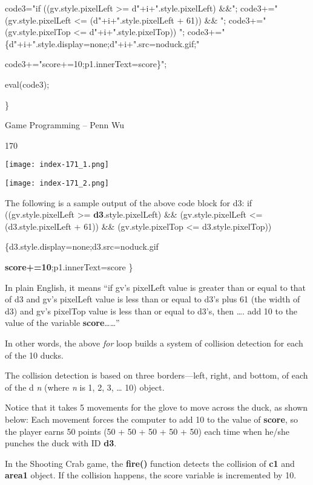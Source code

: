 \documentclass[
]{article}
\begin{document}
code3="if ((gv.style.pixelLeft \textgreater= d"+i+".style.pixelLeft)
\&\&"; code3+=" (gv.style.pixelLeft \textless= (d"+i+".style.pixelLeft +
61)) \&\& "; code3+=" (gv.style.pixelTop \textless=
d"+i+".style.pixelTop)) ";
code3+="\{d"+i+".style.display=\textquotesingle none\textquotesingle;d"+i+".src=\textquotesingle noduck.gif\textquotesingle;"

code3+="score+=10;p1.innerText=score\}";

eval(code3);

\}

Game Programming -- Penn Wu

170

\protect\hypertarget{index_split_011.htmlux5cux23p171}{}{}\texttt{[image: index-171\_1.png]}

\texttt{[image: index-171\_2.png]}

The following is a sample output of the above code block for d3: if
((gv.style.pixelLeft \textgreater= \textbf{d3}.style.pixelLeft) \&\&
(gv.style.pixelLeft \textless= (d3.style.pixelLeft + 61)) \&\&
(gv.style.pixelTop \textless= d3.style.pixelTop))

\{d3.style.display=\textquotesingle none\textquotesingle;d3.src=\textquotesingle noduck.gif\textquotesingle{}

\textbf{score+=10};p1.innerText=score \}

In plain English, it means ``if gv's pixelLeft value is greater than or
equal to that of d3 and gv's pixelLeft value is less than or equal to
d3's plus 61 (the width of d3) and gv's pixelTop value is less than or
equal to d3's, then \ldots. add 10 to the value of the variable
\textbf{score}\ldots\ldots''

In other words, the above \emph{for} loop builds a system of collision
detection for each of the 10 ducks.

The collision detection is based on three borders---left, right, and
bottom, of each of the d \emph{n} (where \emph{n} is 1, 2, 3, \ldots{}
10) object.

Notice that it takes 5 movements for the glove to move across the duck,
as shown below: Each movement forces the computer to add 10 to the value
of \textbf{score}, so the player earns 50 points (50 + 50 + 50 + 50 +
50) each time when he/she punches the duck with ID \textbf{d3}.

In the Shooting Crab game, the \textbf{fire()} function detects the
collision of \textbf{c1} and \textbf{area1} object. If the collision
happens, the score variable is incremented by 10.
\end{document}
